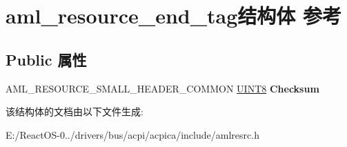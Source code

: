 \hypertarget{structaml__resource__end__tag}{}\section{aml\+\_\+resource\+\_\+end\+\_\+tag结构体 参考}
\label{structaml__resource__end__tag}
\subsection*{Public 属性}
\begin{DoxyCompactItemize}
\item 
\mbox{\label{structaml__resource__end__tag_af304cbd38fa191f3509a2088b9658e33}} 
A\+M\+L\+\_\+\+R\+E\+S\+O\+U\+R\+C\+E\+\_\+\+S\+M\+A\+L\+L\+\_\+\+H\+E\+A\+D\+E\+R\+\_\+\+C\+O\+M\+M\+ON \hyperlink{_processor_bind_8h_ab27e9918b538ce9d8ca692479b375b6a}{U\+I\+N\+T8} {\bfseries Checksum}
\end{DoxyCompactItemize}


该结构体的文档由以下文件生成\+:\begin{DoxyCompactItemize}
\item 
E\+:/\+React\+O\+S-\/0../drivers/bus/acpi/acpica/include/amlresrc.\+h\end{DoxyCompactItemize}
